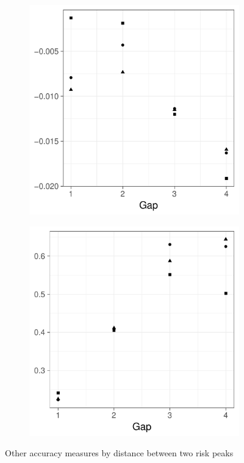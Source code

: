 \begin{figure}[htbp]
    \begin{subfigure}[b]{0.49\textwidth}
        \includegraphics[width=\textwidth]{results/by_two_peaks/centroid-bias-vs-risk-peak-gap}
        \caption{}
        \label{fig:other_measures:p1.4_100_G:centroid_bias}
    \end{subfigure}
    \begin{subfigure}[b]{0.49\textwidth}
        \includegraphics[width=\textwidth]{results/by_two_peaks/centroid-drift-vs-risk-peak-gap}
        \caption{}
        \label{fig:other_measures:p1.4_100_G:centroid_drift}
    \end{subfigure}
    \caption{Other accuracy measures by distance between two risk peaks}
    \label{fig:other_measures:p1.4_100_G}
\end{figure}

